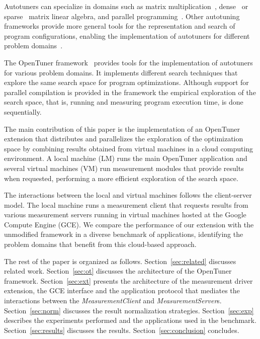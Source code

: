 \documentclass[12pt]{article}
\begin{document}
Autotuners can specialize in domains such as matrix
multiplication~\cite{bilmes1997phipac}, dense~\cite{whaley1998atlas} or
sparse~\cite{vuduc2005oski} matrix linear algebra, and parallel
programming~\cite{jordan2012multi}. Other autotuning frameworks provide more
general tools for the representation and search of program configurations,
enabling the implementation of autotuners for different problem
domains~\cite{ansel2014opentuner,hutter2009paramils}.

The OpenTuner framework~\cite{ansel2014opentuner} provides tools for the
implementation of autotuners for various problem domains. It implements
different search techniques that explore the same search space for program
optimizations. Although support for parallel compilation is provided in the
framework the empirical exploration of the search space, that is, running and
measuring program execution time, is done sequentially.

The main contribution of this paper is the implementation of an
OpenTuner extension that distributes and parallelizes the exploration of
the optimization space by combining results obtained from virtual machines
in a cloud computing environment. A local machine (LM) runs the main
OpenTuner application and several virtual machines (VM) run measurement
modules that provide results when requested, performing a more efficient
exploration of the search space.

The interactions between the local and virtual machines follows
the client-server model. The local machine runs a measurement client that
requests results from various measurement servers running in virtual machines
hosted at the Google Compute Engine (GCE).
We compare the performance of our extension with the
unmodified framework in a diverse benchmark of applications, identifying
the problem domains that benefit from this cloud-based approach.

The rest of the paper is organized as follows.
Section~\ref{sec:related} discusses related work.
Section~\ref{sec:ot} discusses the architecture of the OpenTuner framework.
Section~\ref{sec:ext} presents the architecture of the measurement driver
extension, the GCE interface and the application protocol
that mediates the interactions between the \emph{MeasurementClient} and
\emph{MeasurementServer}s.
Section~\ref{sec:norm} discusses the result normalization strategies.
Section~\ref{sec:exp} describes the experiments performed and the
applications used in the benchmark.
Section~\ref{sec:results} discusses the results.
Section~\ref{sec:conclusion} concludes.
\end{document}
